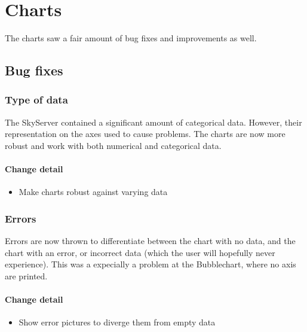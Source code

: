 \section{Charts}
The charts saw a fair amount of bug fixes and improvements as well.


\subsection{Bug fixes}
  \subsubsection{Type of data}
  The SkyServer contained a significant amount of categorical data. However, their representation on the axes
  used to cause problems. The charts are now more robust and work with both numerical and categorical data.
  
 \paragraph{Change detail}
\begin{itemize}
  \item Make charts robust against varying data
\end{itemize}
  
 \subsubsection{Errors}
  Errors are now thrown to differentiate between the chart with no data, and the chart with an error,
  or incorrect data (which the user will hopefully never experience). This was a expecially a problem
  at the Bubblechart, where no axis are printed.
  
   \paragraph{Change detail}
\begin{itemize}
  \item Show error pictures to diverge them from empty data
\end{itemize}
  
